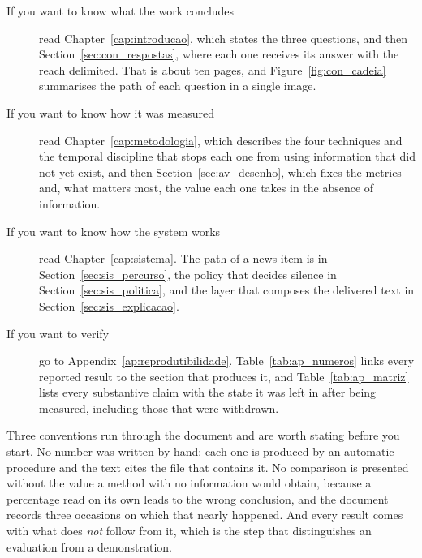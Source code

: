\begin{description}
  \item[If you want to know what the work concludes] read Chapter~\ref{cap:introducao}, which
    states the three questions, and then Section~\ref{sec:con_respostas}, where each one receives
    its answer with the reach delimited. That is about ten pages, and
    Figure~\ref{fig:con_cadeia} summarises the path of each question in a single image.

  \item[If you want to know how it was measured] read Chapter~\ref{cap:metodologia}, which
    describes the four techniques and the temporal discipline that stops each one from using
    information that did not yet exist, and then Section~\ref{sec:av_desenho}, which fixes the
    metrics and, what matters most, the value each one takes in the absence of information.

  \item[If you want to know how the system works] read Chapter~\ref{cap:sistema}. The path of a
    news item is in Section~\ref{sec:sis_percurso}, the policy that decides silence in
    Section~\ref{sec:sis_politica}, and the layer that composes the delivered text in
    Section~\ref{sec:sis_explicacao}.

  \item[If you want to verify] go to Appendix~\ref{ap:reprodutibilidade}.
    Table~\ref{tab:ap_numeros} links every reported result to the section that produces it, and
    Table~\ref{tab:ap_matriz} lists every substantive claim with the state it was left in after
    being measured, including those that were withdrawn.
\end{description}

Three conventions run through the document and are worth stating before you start. No number was
written by hand: each one is produced by an automatic procedure and the text cites the file that
contains it. No comparison is presented without the value a method with no information would
obtain, because a percentage read on its own leads to the wrong conclusion, and the document
records three occasions on which that nearly happened. And every result comes with what does
\emph{not} follow from it, which is the step that distinguishes an evaluation from a
demonstration.


